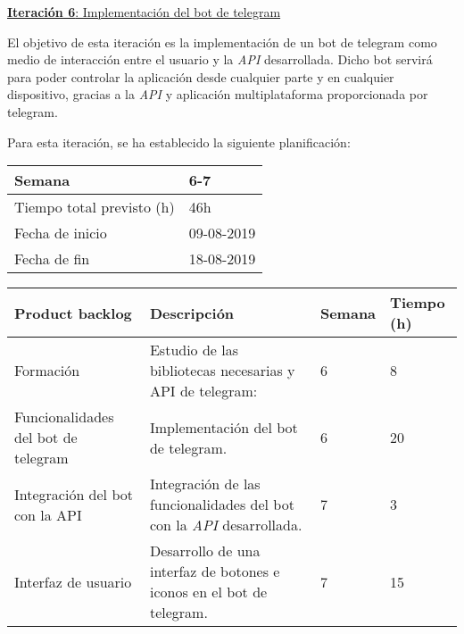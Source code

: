 \newpage


\large{\underline{\textbf{Iteración 6}: Implementación del bot de telegram}}
\vspace{0.3cm}

\normalsize

El objetivo de esta iteración es la implementación de un bot de telegram como medio de interacción entre el usuario y la \textit{API} desarrollada. Dicho bot servirá para poder controlar la aplicación desde cualquier parte y en cualquier dispositivo, gracias a la \textit{API} y aplicación multiplataforma proporcionada por telegram.

Para esta iteración, se ha establecido la siguiente planificación:

\begin{table}[h!]
\centering
\begin{tabular}{|p{5cm}|p{4cm}|}
 \hline
	\cellcolor[gray]{0.9} Semana  & 6-7\\ \hline
	\cellcolor[gray]{0.9} Tiempo total previsto (h)  & 46h \\ \hline
	\cellcolor[gray]{0.9} Fecha de inicio  & 09-08-2019 \\ \hline
	\cellcolor[gray]{0.9} Fecha de fin  & 18-08-2019 \\ \hline
		
\end{tabular}
\end{table}

\begin{table}[h!]
\begin{tabular}{|p{4cm}|p{7.2cm}|p{1.3cm}|p{2.1cm}|}
\hline
\rowcolor[HTML]{9B9B9B} 
{\color[HTML]{FFFFFF} Product backlog} & {\color[HTML]{FFFFFF} Descripción}                                  & {\color[HTML]{FFFFFF} Semana} & {\color[HTML]{FFFFFF}Tiempo (h)} \\ \hline

Formación                          & Estudio de las bibliotecas necesarias y API de telegram:
                                        & 6                            & 8                                   \\ \hline
          
Funcionalidades del bot de telegram                         &  Implementación del bot de telegram.
          & 6                             & 20                                   \\ \hline

Integración del bot con la API & Integración de las funcionalidades del bot con la \textit{API} desarrollada.

          & 7                             & 3                                   \\ \hline

Interfaz de usuario                        & Desarrollo de una interfaz de botones e iconos en el bot de telegram.
          & 7                             & 15                                  \\ \hline

\end{tabular}
\end{table}

